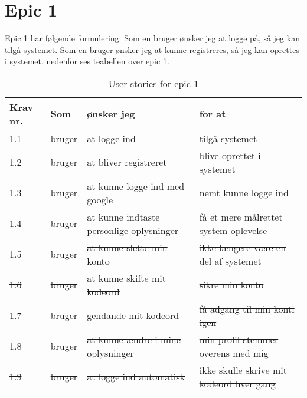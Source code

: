 \section{Epic 1}
Epic 1 har følgende formulering: 
Som en bruger ønsker jeg at logge på, så jeg kan tilgå systemet.
Som en bruger ønsker jeg at kunne registreres, så jeg kan oprettes i systemet.
nedenfor ses teabellen over epic 1.

\begin{table}[H]
    \centering
    \caption{User stories for epic 1}
    \label{tab:us-epic1}
    \begin{tabular}{p{1cm}|p{2cm}|p{6cm}|p{6cm}}
        \textbf{Krav nr.} & \textbf{Som} & \textbf{ønsker jeg}                      & \textbf{for at}                          \\
        \hline
        1.1               & bruger       & at logge ind                             & tilgå systemet                           \\
        \hline
        1.2               & bruger       & at bliver registreret                    & blive oprettet i systemet                \\
        \hline
        1.3               & bruger       & at kunne logge ind med google            & nemt kunne logge ind                     \\
        \hline
        1.4               & bruger       & at kunne indtaste personlige oplysninger & få et mere målrettet system oplevelse    \\
		\hline
     	\sout{1.5}        & \sout{bruger}       & \sout{at kunne slette min konto}  & \sout{ikke længere være en del af systemet}  \\ 
        \hline
		\sout{1.6}        & \sout{bruger}        & \sout{at kunne skifte mit kodeord}              & \sout{sikre min konto}           \\
        \hline
        \sout{1.7}        & \sout{bruger}        & \sout{gendande mit kodeord}                     & \sout{få adgang til min konti igen}             \\
        \hline
        \sout{1.8}        & \sout{bruger}        & \sout{at kunne ændre i mine oplysninger}        & \sout{min profil stemmer overens med mig}       \\
        \hline
        \sout{1.9}        & \sout{bruger}        & \sout{at logge ind automatisk}           & \sout{ikke skulle skrive mit kodeord hver gang} \\
    \end{tabular}
\end{table}

